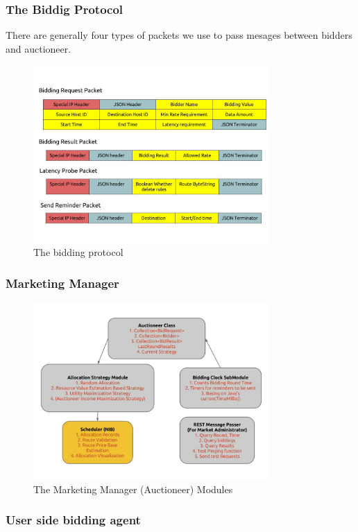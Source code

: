 \documentclass[a4paper,11pt,twocolumn]{article}
\begin{document}
\subsubsection{The Biddig Protocol}
There are generally four types of packets we use to pass mesages between bidders and auctioneer. 

\begin{figure}[ht!]
\centering
\includegraphics[width=90mm]{protocol.jpg}
\caption{The bidding protocol}
\label{overflow}
\end{figure}

\subsubsection{Marketing Manager}

\begin{figure}[ht!]
\centering
\includegraphics[width=90mm]{core.jpg}
\caption{The Marketing Manager (Auctioneer) Modules}
\label{overflow}
\end{figure}

\subsubsection{User side bidding agent}
\end{document}
